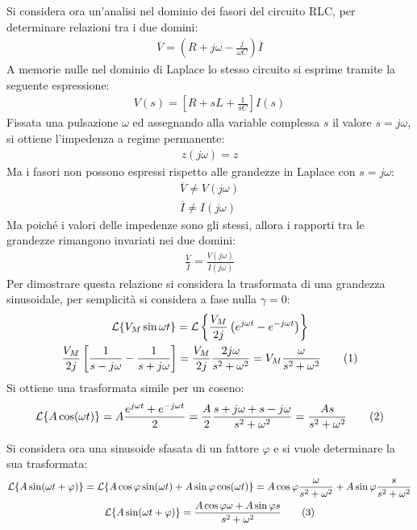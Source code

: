 \documentclass{article}
\newcommand{\tageq}{\tag{\stepcounter{equation}\theequation}}
\numberwithin{equation}{subsection}
\begin{document}
Si considera ora un'analisi nel dominio dei fasori del circuito RLC, per determinare relazioni tra i due domini: 
\begin{gather*}
    \overline{V}=\left(R+j\omega-\displaystyle\frac{j}{\omega C}\right)\overline{I}
\end{gather*}
A memorie nulle nel dominio di Laplace lo stesso circuito si esprime tramite la seguente espressione:
\begin{gather*}
    V(s)=\left[R+sL+\displaystyle\frac{1}{sC}\right]I(s)
\end{gather*}
Fissata una pulsazione $\omega$ ed assegnando alla variable complessa $s$ il valore $s=j\omega$, si ottiene l'impedenza a regime permanente:
\begin{gather*}
    z(j\omega)=z
\end{gather*}
Ma i fasori non possono espressi rispetto alle grandezze in Laplace con $s=j\omega$:
\begin{gather*}
    \overline{V}\neq V(j\omega)\\
    \overline{I}\neq I(j\omega)
\end{gather*}
Ma poiché i valori delle impedenze sono gli stessi, allora i rapporti tra le grandezze rimangono invariati nei due domini:
\begin{gather*}
    \displaystyle\frac{\overline{V}}{\overline{I}}=\frac{V(j\omega)}{I(j\omega)}
\end{gather*}
Per dimostrare questa relazione si considera la trasformata di una grandezza sinusoidale, per semplicità si considera a fase nulla $\gamma=0$: 
\begin{gather*}
    \mathcal{L}\{V_M\sin\omega t\}=\mathcal{L}\left\{\displaystyle\frac{V_M}{2j}\left(e^{j\omega t}-e^{-j\omega t}\right)\right\}\\
    \frac{V_M}{2j}\left[\frac{1}{s-j\omega}-\frac{1}{s+j\omega}\right]=\frac{V_M}{2j}\frac{2j\omega}{s^2+\omega^2}=V_M\frac{\omega}{s^2+\omega^2}\tageq
\end{gather*}
Si ottiene una trasformata simile per un coseno:
\begin{gather*}
    \mathcal{L}\{A\cos(\omega t)\}=A\displaystyle\frac{e^{j\omega t}+e^{-j\omega t}}{2}=\frac{A}{2}\frac{s+j\omega+s-j\omega}{s^2+\omega^2}=\frac{As}{s^2+\omega^2}\tageq
\end{gather*}

Si considera ora una sinusoide sfasata di un fattore $\varphi$ e si vuole determinare la sua trasformata:
\begin{gather*}
    \mathcal{L}\{A\sin(\omega t+\varphi)\}=\mathcal{L}\{A\cos\varphi\sin(\omega t)+A\sin\varphi\cos(\omega t)\}=\displaystyle A\cos\varphi\frac{\omega}{s^2+\omega^2}+A\sin\varphi\frac{s}{s^2+\omega^2}\\
    \mathcal{L}\{A\sin(\omega t+\varphi)\}=\displaystyle\frac{A\cos\varphi \omega+A\sin\varphi s}{s^2+\omega^2}\tageq
\end{gather*}
\end{document}

